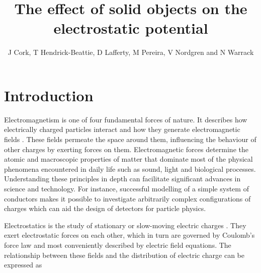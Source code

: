 \documentclass[a4paper]{jpconf}
\begin{document}
\title{The effect of solid objects on the electrostatic potential}
\author{J Cork, T  Hendrick-Beattie, D Lafferty, M Pereira, V Nordgren and N Warrack}
\address{School of Physics and Astronomy, University of Glasgow, Glasgow, UK}

\begin{abstract}
\end{abstract}

\section*{Introduction}
Electromagnetism is one of four fundamental forces of nature. It describes how electrically charged particles interact 
and how they generate electromagnetic fields \cite{Sears.Zamansky-uniPhy}. These fields permeate the space around them, influencing the behaviour of other charges by exerting forces on them. %
Electromagnetic forces determine the atomic and macroscopic properties of matter that dominate most of the physical phenomena encountered in daily life such as sound, light and biological processes. Understanding these principles in depth can facilitate significant advances in science and technology. For instance, successful modelling of a simple system of conductors makes it possible to investigate arbitrarily complex configurations of charges which can aid the design of detectors for particle physics. 



Electrostatics is the study of stationary or slow-moving electric charges \cite{griffiths-introElec}. They exert electrostatic forces on each other, which in turn are governed by Coulomb's force law and most conveniently described by electric field equations. The relationship between these fields and the distribution of electric charge can be expressed as \cite{griffiths-introElec}
\end{document}
